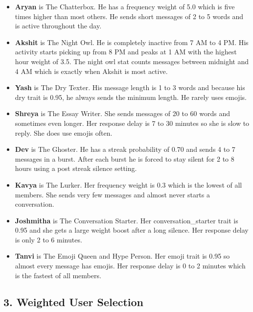 \documentclass{article}
\begin{document}
\begin{itemize}
    \item \textbf{Aryan} is The Chatterbox. He has a frequency weight of 5.0 which is five times higher than most others. He sends short messages of 2 to 5 words and is active throughout the day.

    \item \textbf{Akshit} is The Night Owl. He is completely inactive from 7 AM to 4 PM. His activity starts picking up from 8 PM and peaks at 1 AM with the highest hour weight of 3.5. The night owl stat counts messages between midnight and 4 AM which is exactly when Akshit is most active.

    \item \textbf{Yash} is The Dry Texter. His message length is 1 to 3 words and because his dry trait is 0.95, he always sends the minimum length. He rarely uses emojis.

    \item \textbf{Shreya} is The Essay Writer. She sends messages of 20 to 60 words and sometimes even longer. Her response delay is 7 to 30 minutes so she is slow to reply. She does use emojis often.

    \item \textbf{Dev} is The Ghoster. He has a streak probability of 0.70 and sends 4 to 7 messages in a burst. After each burst he is forced to stay silent for 2 to 8 hours using a post streak silence setting.

    \item \textbf{Kavya} is The Lurker. Her frequency weight is 0.3 which is the lowest of all members. She sends very few messages and almost never starts a conversation.

    \item \textbf{Joshmitha} is The Conversation Starter. Her conversation\_starter trait is 0.95 and she gets a large weight boost after a long silence. Her response delay is only 2 to 6 minutes.

    \item \textbf{Tanvi} is The Emoji Queen and Hype Person. Her emoji trait is 0.95 so almost every message has emojis. Her response delay is 0 to 2 minutes which is the fastest of all members.
\end{itemize}

\subsection*{3. Weighted User Selection}
\end{document}
